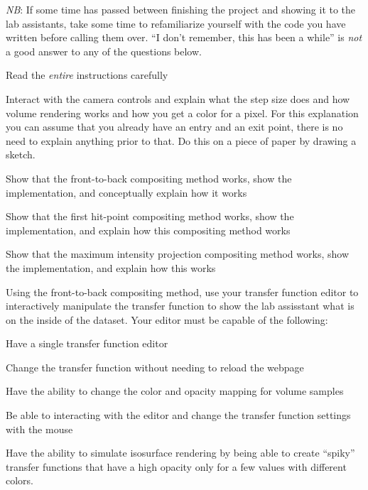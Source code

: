 \documentclass{labinstructions}
\begin{document}
\emph{NB}: If some time has passed between finishing the project and showing it to the lab assistants, take some time to refamiliarize yourself with the code you have written before calling them over.  ``I don't remember, this has been a while'' is \emph{not} a good answer to any of the questions below.
\begin{todolist}
  \item Read the \emph{entire} instructions carefully
  \item Interact with the camera controls and explain what the step size does and how volume rendering works and how you get a color for a pixel.  For this explanation you can assume that you already have an entry and an exit point, there is no need to explain anything prior to that.  Do this on a piece of paper by drawing a sketch.
  \item Show that the front-to-back compositing method works, show the implementation, and conceptually explain how it works
  \item Show that the first hit-point compositing method works, show the implementation, and explain how this compositing method works
  \item Show that the maximum intensity projection compositing method works, show the implementation, and explain how this works
  \item Using the front-to-back compositing method, use your transfer function editor to interactively manipulate the transfer function to show the lab assisstant what is on the inside of the dataset.  Your editor must be capable of the following:
  \begin{todolist}
    \item Have a single transfer function editor
    \item Change the transfer function without needing to reload the webpage
    \item Have the ability to change the color and opacity mapping for volume samples
    \item Be able to interacting with the editor and change the transfer function settings with the mouse
    \item Have the ability to simulate isosurface rendering by being able to create ``spiky'' transfer functions that have a high opacity only for a few values with different colors.
  \end{todolist}
\end{todolist}
\end{document}
